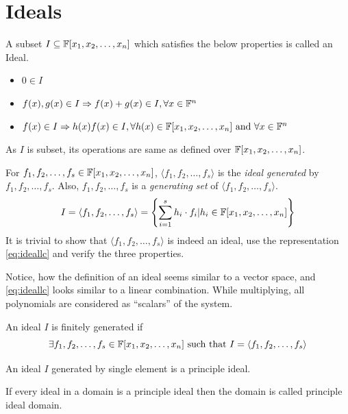 \documentclass[a4paper,11pt]{article}
\begin{document}
\section{Ideals}
\begin{defn}[Ideal]
    A subset $I\subseteq \mathbb{F}[x_1, x_2, \ldots, x_n]$ which satisfies the below properties is called an Ideal.
    \begin{itemize}
        \item $0 \in I$
        \item $f(x),g(x) \in I \Rightarrow f(x)+g(x)\in I, \forall x \in \mathbb{F}^n$
        \item $f(x) \in I \Rightarrow h(x)f(x)\in I, \forall h(x)\in \mathbb{F}[x_1, x_2, \ldots, x_n] \text{ and }\forall x \in \mathbb{F}^n$
    \end{itemize}
    As $I$ is subset, its operations are same as defined over $\mathbb{F}[x_1, x_2, \ldots, x_n]$.
\end{defn}
\begin{lem}
    For $f_1,f_2,\ldots,f_s\in\mathbb{F}[x_1, x_2, \ldots, x_n]$,  $\langle f_1,f_2,\ldots,f_s\rangle$ is the \emph{ideal generated} by $f_1,f_2,\ldots,f_s$. Also, $f_1,f_2,\ldots,f_s$ is a \emph{generating set} of $\langle f_1,f_2,\ldots,f_s\rangle$.
    \begin{equation}{\label{eq:ideallc}}
        I = \langle f_1,f_2,\ldots,f_s\rangle = \left\{\sum_{i=1}^{s}h_{i}\cdot f_{i}|h_i \in \mathbb{F}[x_1, x_2, \ldots, x_n]\right\}
    \end{equation}
    It is trivial to show that $\langle f_1,f_2,\ldots,f_s\rangle$ is indeed an ideal, use the representation \ref{eq:ideallc} and verify the three properties.
\end{lem}
Notice, how the definition of an ideal seems similar to a vector space, and \ref{eq:ideallc} looks similar to a linear combination. While multiplying, all polynomials are considered as ``scalars'' of the system. 
\begin{defn}
    An ideal $I$ is finitely generated if
    \begin{equation}
        \exists f_1,f_2,\ldots,f_s \in \mathbb{F}[x_1, x_2, \ldots, x_n] \text{ such that }I=\langle f_1,f_2,\ldots,f_s\rangle
    \end{equation}
\end{defn}
\begin{defn}
    An ideal $I$ generated by single element is a principle ideal.
\end{defn}
\begin{defn}
    If every ideal in a domain is a principle ideal then the domain is called principle ideal domain.
\end{defn}
\end{document}

